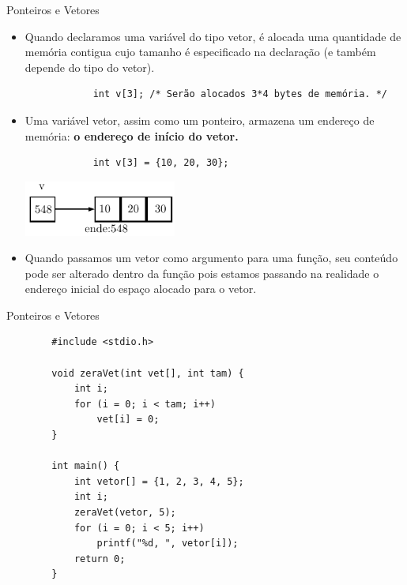 \documentclass[handout]{beamer}
\begin{document}
\begin{frame}[fragile]{Ponteiros e Vetores}
    \begin{small}
    \begin{itemize}[<+->]
        \item Quando declaramos uma variável do tipo vetor, é alocada uma quantidade
        de memória contigua cujo tamanho é especificado na declaração (e também depende do tipo do vetor).
        \begin{verbatim}
            int v[3]; /* Serão alocados 3*4 bytes de memória. */
        \end{verbatim}
        \vspace{-0.5em}
        \item Uma variável vetor, assim como um ponteiro, armazena um endereço de memória: {\bf o endereço de início do vetor.}
        \vspace{-0.5em}
        \begin{verbatim}
            int v[3] = {10, 20, 30};
        \end{verbatim}
        \vspace{-0.5em}
        \begin{center}
            \includegraphics[width=5cm]{ponteiro2.pdf}
        \end{center}
        \vspace{-1em}
        \item Quando passamos um vetor como argumento para uma função, seu conteúdo pode ser alterado
        dentro da função pois estamos passando na realidade o endereço inicial do espaço alocado para o vetor.
    \end{itemize}
    \end{small}
\end{frame}


\begin{frame}[fragile]{Ponteiros e Vetores}

    \begin{verbatim}
        #include <stdio.h>

        void zeraVet(int vet[], int tam) {
            int i;
            for (i = 0; i < tam; i++)
                vet[i] = 0;
        }

        int main() {
            int vetor[] = {1, 2, 3, 4, 5};
            int i;
            zeraVet(vetor, 5);
            for (i = 0; i < 5; i++)
                printf("%d, ", vetor[i]);
            return 0;
        }
    \end{verbatim}

\end{frame}
\end{document}
